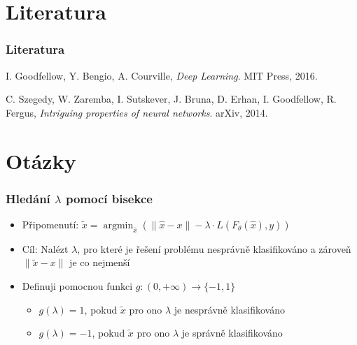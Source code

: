 \documentclass[czech]{beamer}
\begin{document}
\section*{Literatura}

\begin{frame}
    \frametitle{Literatura}
    \begin{thebibliography}{1}
        I. Goodfellow, Y. Bengio, A. Courville,
        \emph{Deep Learning}. MIT Press, 2016.


         C. Szegedy, W. Zaremba, I. Sutskever, J. Bruna, D. Erhan, I. Goodfellow, R. Fergus,
        \emph{Intriguing properties of neural networks}.
        arXiv, 2014.

    \end{thebibliography}
\end{frame}

\section{Otázky}

\begin{frame}
    \frametitle{Hledání $\lambda$ pomocí bisekce}
    \begin{itemize}
        \item Připomenutí: $\tilde{x}  = \operatorname{argmin}_{\hat{x}} \left(\|\hat{x} - x\|
        - \lambda \cdot L(F_{\theta}(\hat{x}), y) \right)$
        \item Cíl: Nalézt $\lambda$, pro které je řešení problému nesprávně klasifikováno a zároveň $\|\tilde{x} - x\|$ je co nejmenší
        \item Definuji pomocnou funkci $g: (0, + \infty) \rightarrow \{-1, 1\}$
        \begin{itemize}
            \item $g(\lambda) = 1$, pokud $\tilde{x}$ pro ono $\lambda$ je nesprávně klasifikováno
            \item $g(\lambda) = -1$, pokud $\tilde{x}$ pro ono $\lambda$ je správně klasifikováno
        \end{itemize}
    \end{itemize}
\end{frame}
\end{document}
